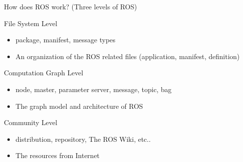 \documentclass[10pt]{beamer}
\begin{document}
 \begin{frame}{How does ROS work? (Three levels of ROS)}
 
 \begin{block}{File System Level}
  \begin{itemize}
   \item package, manifest, message types
   \item An organization of the ROS related files (application, manifest, definition)
  \end{itemize}
 \end{block}
 \begin{block}{Computation Graph Level}
  \begin{itemize}
   \item node, master, parameter server, message, topic, bag
   \item The graph model and architecture of ROS
  \end{itemize}
 \end{block}
 \begin{block}{Community Level}
  \begin{itemize}
   \item distribution, repository, The ROS Wiki, etc..
   \item The resources from Internet
  \end{itemize}
 \end{block}  
 \end{frame}
\end{document}
